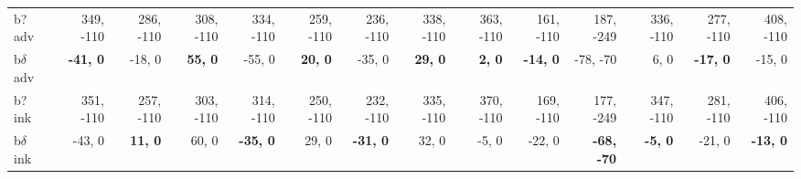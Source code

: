 \begin{table}[p]
{\begin{tabular}{lrrrrrrrrrrrrr}
b? adv & 349, -110 & 286, -110 & 308, -110 & 334, -110 & 259, -110 & 236, -110 & 338, -110 & 363, -110 & 161, -110 & 187, -249 & 336, -110 & 277, -110 & 408, -110 \\
b$\delta$ adv & \textbf{-41, 0} & -18, 0 & \textbf{55, 0} & -55, 0 & \textbf{20, 0} & -35, 0 & \textbf{29, 0} & \textbf{2, 0} & \textbf{-14, 0} & -78, -70 & 6, 0 & \textbf{-17, 0} & -15, 0 \\
b? ink & 351, -110 & 257, -110 & 303, -110 & 314, -110 & 250, -110 & 232, -110 & 335, -110 & 370, -110 & 169, -110 & 177, -249 & 347, -110 & 281, -110 & 406, -110 \\
b$\delta$ ink & -43, 0 & \textbf{11, 0} & 60, 0 & \textbf{-35, 0} & 29, 0 & \textbf{-31, 0} & 32, 0 & -5, 0 & -22, 0 & \textbf{-68, -70} & \textbf{-5, 0} & -21, 0 & \textbf{-13, 0} \\

\end{tabular}
}
\end{table}
\clearpage


